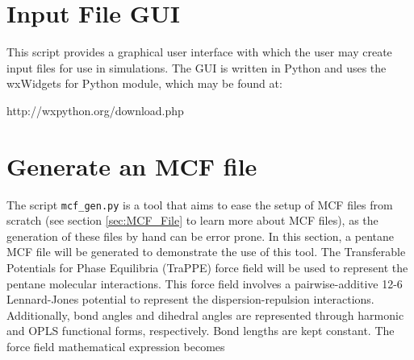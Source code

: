 %
%
%
%
%
%
%

\section{Input File GUI} \label{Sec:GUI}
This script provides a graphical user interface with which the user may create input files for use in simulations.  The GUI is written
 in Python and uses the wxWidgets for Python module, which may be found at:   

http://wxpython.org/download.php 

\section{Generate an MCF file}
\label{utility:mcfgen}

The script \texttt{mcf\_gen.py} is a tool that aims to ease the setup of MCF files from scratch (see section \ref{sec:MCF_File} to learn more
about MCF files), as the generation of these files by hand can be error prone. 
In this section, a pentane MCF file will be generated to demonstrate the use of this tool.
The Transferable Potentials for Phase Equilibria (TraPPE) force field will be used to represent the pentane molecular interactions. 
This force field involves a pairwise-additive 12-6 Lennard-Jones potential to represent the dispersion-repulsion interactions. Additionally, bond angles and dihedral angles are represented through
harmonic and OPLS functional forms, respectively. Bond lengths are kept constant. The force field mathematical
expression becomes

